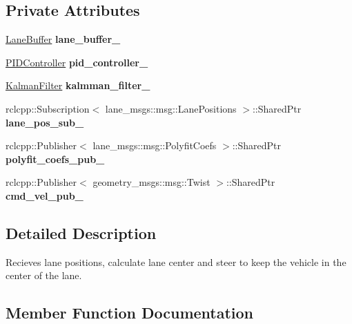 \subsection*{Private Attributes}
\begin{DoxyCompactItemize}
\item 
\mbox{\label{classMotionControlNode_ab153e88844739c39e94bf0ba8540251e}} 
\hyperlink{classLaneBuffer}{Lane\+Buffer} {\bfseries lane\+\_\+buffer\+\_\+}
\item 
\mbox{\label{classMotionControlNode_a9848ef14a93e7123e9ce374b422d7952}} 
\hyperlink{classPIDController}{P\+I\+D\+Controller} {\bfseries pid\+\_\+controller\+\_\+}
\item 
\mbox{\label{classMotionControlNode_a62db65bd876573bdd43ffe25bfb6e7c5}} 
\hyperlink{classKalmanFilter}{Kalman\+Filter} {\bfseries kalmman\+\_\+filter\+\_\+}
\item 
\mbox{\label{classMotionControlNode_a6fa75a61f3fe7005de566cd309ae9c89}} 
rclcpp\+::\+Subscription$<$ lane\+\_\+msgs\+::msg\+::\+Lane\+Positions $>$\+::Shared\+Ptr {\bfseries lane\+\_\+pos\+\_\+sub\+\_\+}
\item 
\mbox{\label{classMotionControlNode_adc9d49fff416c5cb0876d0faca92b081}} 
rclcpp\+::\+Publisher$<$ lane\+\_\+msgs\+::msg\+::\+Polyfit\+Coefs $>$\+::Shared\+Ptr {\bfseries polyfit\+\_\+coefs\+\_\+pub\+\_\+}
\item 
\mbox{\label{classMotionControlNode_a372b6363a6aaa816636bb3dc9e371eb1}} 
rclcpp\+::\+Publisher$<$ geometry\+\_\+msgs\+::msg\+::\+Twist $>$\+::Shared\+Ptr {\bfseries cmd\+\_\+vel\+\_\+pub\+\_\+}
\end{DoxyCompactItemize}


\subsection{Detailed Description}
Recieves lane positions, calculate lane center and steer to keep the vehicle in the center of the lane. 

\subsection{Member Function Documentation}
\mbox{\label{classMotionControlNode_a2c48d9d1ef7222d03c69f8dc86cd1842}} 
